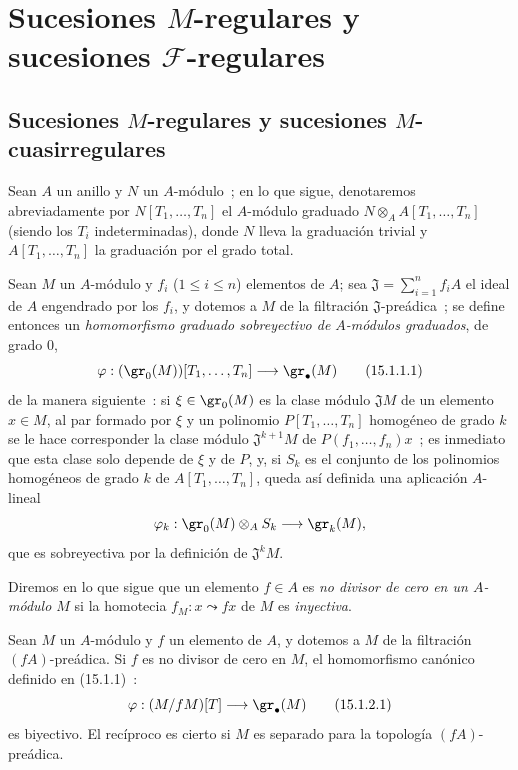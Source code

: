 \section{Sucesiones \texorpdfstring{$M$}{M}-regulares y sucesiones
\texorpdfstring{$\mathscr F$}{F}-regulares}
\label{section:0.15-fr}

\subsection{Sucesiones \texorpdfstring{$M$}{M}-regulares y sucesiones
\texorpdfstring{$M$}{M}-cuasirregulares}
\label{subsection:0.15.1-fr}
\label{0.15.1-fr}

\begin{env}[15.1.1]
\label{0.15.1.1-fr}

Sean $A$ un anillo y $N$ un $A$-módulo~; en lo que sigue, denotaremos
abreviadamente por $N[T_1,\ldots,T_n]$ el $A$-módulo graduado
$N\otimes_A A[T_1,\ldots,T_n]$ (siendo los $T_i$ indeterminadas), donde $N$
lleva la graduación trivial y $A[T_1,\ldots,T_n]$ la graduación por el grado total.

Sean $M$ un $A$-módulo y $f_i$ ($1\leq i\leq n$) elementos de $A$;
sea $\mathfrak{J}=\sum_{i=1}^n f_iA$ el ideal de $A$ engendrado por los $f_i$,
y dotemos a $M$ de la filtración $\mathfrak{J}$-preádica~; se define entonces un
\emph{homomorfismo graduado sobreyectivo de $A$-módulos graduados}, de grado $0$,
\[
  \varphi : (\gr_0(M))[T_1,\ldots,T_n]\longrightarrow\gr_\bullet(M)
  \tag{15.1.1.1}\label{0.15.1.1.1-fr}
\]
de la manera siguiente~: si $\xi\in\gr_0(M)$ es la clase módulo
$\mathfrak{J}M$ de un elemento $x\in M$, al par formado por $\xi$ y un
polinomio $P[T_1,\ldots,T_n]$ homogéneo de grado $k$ se le hace corresponder la
clase módulo $\mathfrak{J}^{k+1}M$ de $P(f_1,\ldots,f_n)x$~; es inmediato
que esta clase
solo depende de $\xi$ y de $P$, y, si $S_k$ es el conjunto de los polinomios
homogéneos de grado $k$ de $A[T_1,\ldots,T_n]$, queda así definida una
aplicación $A$-lineal
\[
  \varphi_k:\gr_0(M)\otimes_A S_k\longrightarrow\gr_k(M),
\]
que es sobreyectiva por la definición de $\mathfrak{J}^kM$.

Diremos en lo que sigue que un elemento $f\in A$ es \emph{no divisor de
cero en un $A$-módulo $M$} si la homotecia $f_M:x\leadsto fx$ de $M$ es
\emph{inyectiva}.
\end{env}

\begin{lemma}[15.1.2]
\label{0.15.1.2-fr}
Sean $M$ un $A$-módulo y $f$ un elemento de $A$, y dotemos a $M$ de la
filtración $(fA)$-preádica. Si $f$ es no divisor de cero en $M$,
el homomorfismo canónico definido en (15.1.1)~:
\[
  \varphi:(M/fM)[T]\longrightarrow\gr_\bullet(M)
  \tag{15.1.2.1}\label{0.15.1.2.1-fr}
\]
es biyectivo. El recíproco es cierto si $M$ es separado para la topología
$(fA)$-preádica.
\end{lemma}

